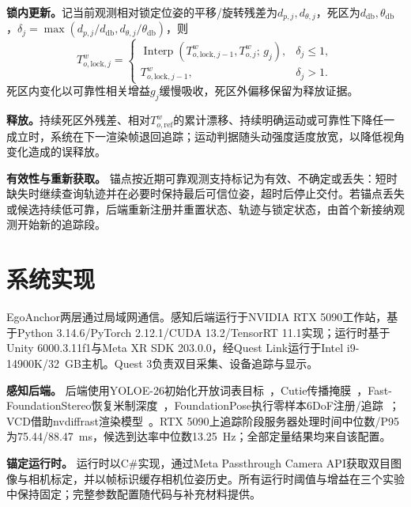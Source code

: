 \documentclass[review]{vgtc}
\begin{document}
\textbf{锁内更新。}记当前观测相对锁定位姿的平移/旋转残差为$d_{p,j},d_{\theta,j}$，死区为$d_{\mathrm{db}},\theta_{\mathrm{db}}$，$\delta_j=\max(d_{p,j}/d_{\mathrm{db}},d_{\theta,j}/\theta_{\mathrm{db}})$，则
\begin{equation}
T_{o,\mathrm{lock},j}^w =
\begin{cases}
\operatorname{Interp}\left(T_{o,\mathrm{lock},j-1}^w, T_{o,j}^{w};\, g_j\right), & \delta_j \leq 1, \\
T_{o,\mathrm{lock},j-1}^w, & \delta_j > 1.
\end{cases}
\label{eq:lock-update}
\end{equation}
死区内变化以可靠性相关增益$g_j$缓慢吸收，死区外偏移保留为释放证据。

\textbf{释放。}持续死区外残差、相对$T_{o,\mathrm{ref}}^w$的累计漂移、持续明确运动或可靠性下降任一成立时，系统在下一渲染帧退回追踪；运动判据随头动强度适度放宽，以降低视角变化造成的误释放。

\textbf{有效性与重新获取。}\label{sec:validity}
锚点按近期可靠观测支持标记为有效、不确定或丢失：短时缺失时继续查询轨迹并在必要时保持最后可信位姿，超时后停止交付。若锚点丢失或候选持续低可靠，后端重新注册并重置状态、轨迹与锁定状态，由首个新接纳观测开始新的追踪段。


\section{系统实现}\label{sec:implementation}

EgoAnchor两层通过局域网通信。感知后端运行于NVIDIA RTX 5090工作站，基于Python 3.14.6/PyTorch 2.12.1/CUDA 13.2/TensorRT 11.1实现；运行时基于Unity 6000.3.11f1与Meta XR SDK 203.0.0，经Quest Link运行于Intel i9-14900K/32~GB主机。Quest 3负责双目采集、设备追踪与显示。

\textbf{感知后端。}
后端使用YOLOE-26初始化开放词表目标~\cite{yoloe2025}，Cutie传播掩膜~\cite{cutie2024}，Fast-FoundationStereo恢复米制深度~\cite{fastfoundationstereo2026}，FoundationPose执行零样本6DoF注册/追踪~\cite{foundationpose2024}；VCD借助nvdiffrast渲染模型~\cite{nvdiffrast2020}。RTX 5090上追踪阶段服务器处理时间中位数/P95为75.44/88.47~ms，候选到达率中位数13.25~Hz；全部定量结果均来自该配置。

\textbf{锚定运行时。}
运行时以C\#实现，通过Meta Passthrough Camera API获取双目图像与相机标定，并以帧标识缓存相机位姿历史。所有运行时阈值与增益在三个实验中保持固定；完整参数配置随代码与补充材料提供。
\end{document}
